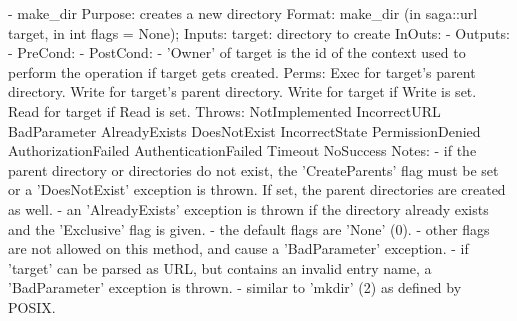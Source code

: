 \begin{myspec}
 
    - make_dir
      Purpose:  creates a new directory
      Format:   make_dir           (in  saga::url  target,
                                    in  int     flags = None);
      Inputs:   target:             directory to create
      InOuts:   -
      Outputs:  -
      PreCond:  -
      PostCond: - 'Owner' of target is the id of the context
                  used to perform the operation if target gets
                  created.
      Perms:    Exec  for target's parent directory.
                Write for target's parent directory.
                Write for target if Write is set.
                Read  for target if Read  is set.
      Throws:   NotImplemented
                IncorrectURL
                BadParameter
                AlreadyExists
                DoesNotExist
                IncorrectState
                PermissionDenied
                AuthorizationFailed
                AuthenticationFailed
                Timeout
                NoSuccess
      Notes:    - if the parent directory or directories do not
                  exist, the 'CreateParents' flag must be set 
                  or a 'DoesNotExist' exception is thrown.  
                  If set, the parent directories are created as 
                  well.
                - an 'AlreadyExists' exception is thrown if the
                  directory already exists and the 'Exclusive' 
                  flag is given.
                - the default flags are 'None' (0).
                - other flags are not allowed on this method, 
                  and cause a 'BadParameter' exception.
                - if 'target' can be parsed as URL, but contains 
                  an invalid entry name, a 'BadParameter'
                  exception is thrown.
                - similar to 'mkdir' (2) as defined by POSIX.
 

\end{myspec}
